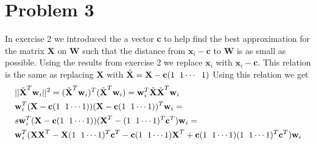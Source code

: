 \documentclass[a4paper,norsk]{article}
\begin{document}
\newpage

\section*{Problem 3}
In exercise 2 we introduced the a vector \textbf{c} to help find the best approximation for the matrix \textbf{X} on \textbf{W} such that the distance from $\textbf{x}_i - \textbf{c}$ to \textbf{W} is as small
as possible. Using the results from exercise 2 we replace $\textbf{x}_i$ with $\textbf{x}_i - \textbf{c}$. This relation is the same as replacing \textbf{X} with 
$\tilde{\textbf{X}} = \textbf{X} - \textbf{c}(1 \hspace{2mm} 1 \cdots \hspace{2mm} 1)$ 
Using this relation we get 
\begin{align*}
&||\tilde{\textbf{X}}^T \textbf{w}_i ||^2 = (\tilde{\textbf{X}}^T \textbf{w}_i)^T (\tilde{\textbf{X}}^T \textbf{w}_i) =  \textbf{w}_i^T \tilde{\textbf{X}} \tilde{\textbf{X}}^T \textbf{w}_i \\
&\textbf{w}_i^T (\textbf{X} - \textbf{c} (1 \hspace{2mm} 1 \cdots 1 )  ) (\textbf{X} - \textbf{c} (1 \hspace{2mm} 1 \cdots 1))^T \textbf{w}_i =\\
&s\textbf{w}_i^T (\textbf{X} - \textbf{c} (1 \hspace{2mm} 1 \cdots 1 )  ) (\textbf{X}^T - (1 \hspace{2mm} 1 \cdots 1)^T \textbf{c}^T) \textbf{w}_i =\\
&\textbf{w}_i^T (\textbf{X}\textbf{X}^T - \textbf{X}(1 \hspace{2mm} 1 \cdots 1)^T\textbf{c}^T - \textbf{c}(1 \hspace{2mm} 1 \cdots 1)\textbf{X}^T +
 \textbf{c}(1 \hspace{2mm} 1 \cdots 1)(1 \hspace{2mm} 1 \cdots 1)^T \textbf{c}^T )\textbf{w}_i 
\end{align*}
\end{document}
